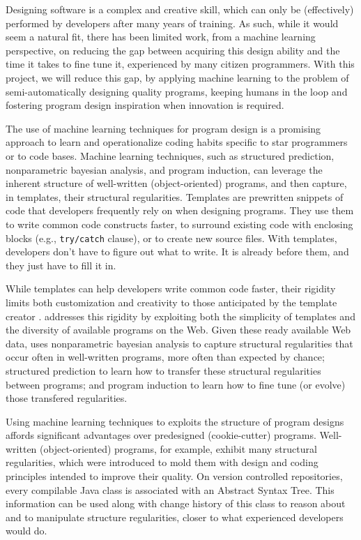 Designing software is a complex and creative skill, which can only be
(effectively) performed by developers after many years of training. As such,
while it would seem a natural fit, there has been limited work, from a machine
learning perspective, on reducing the gap between acquiring this design ability
and the time it takes to fine tune it, experienced by many citizen programmers.
With this project, we will reduce this gap, by applying machine learning to the
problem of semi-automatically designing quality programs, keeping humans in the
loop and fostering program design inspiration when innovation is required.

The use of machine learning techniques for program design is a promising
approach to learn and operationalize coding habits specific to star programmers
or to code bases. Machine learning techniques, such as structured prediction,
nonparametric bayesian analysis, and program induction, can leverage the
inherent structure of well-written (object-oriented) programs, and then capture,
in templates, their structural regularities. Templates are prewritten snippets
of code that developers frequently rely on when designing programs. They use
them to write common code constructs faster, to surround existing code with
enclosing blocks (e.g., \texttt{try/catch} clause), or to create new source
files. With templates, developers don't have to figure out what to write. It is
already before them, and they just have to fill it in.

While templates can help developers write common code faster, their rigidity
limits both customization and creativity to those anticipated by the template
creator \cite{Kumar2011-hy}. \pdm addresses this rigidity by exploiting both the
simplicity of templates and the diversity of available programs on the Web.
Given these ready available Web data, \pdm uses nonparametric bayesian analysis
\cite{allamanis2014mining} to capture structural regularities that occur often
in well-written programs, more often than expected by chance; structured
prediction \cite{collins2002discriminative} to learn how to transfer these
structural regularities between programs; and program induction
\cite{lake2015human} to learn how to fine tune (or evolve) those transfered
regularities.

Using machine learning techniques to exploits the structure of program
designs affords significant advantages over predesigned (cookie-cutter)
programs. Well-written (object-oriented) programs, for example, exhibit many
structural regularities, which were introduced to mold them with design and
coding principles intended to improve their quality. On version controlled
repositories, every compilable Java class is associated with an Abstract Syntax
Tree. This information can be used along with change history of this class to
reason about and to manipulate structure regularities, closer to what
experienced developers would do.

